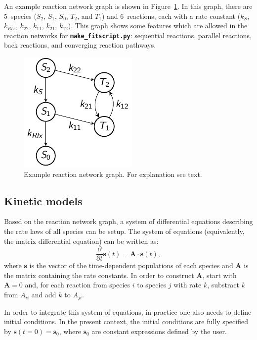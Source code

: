 \documentclass[a4paper,11pt,DIV=15,openany,twoside=false]{scrbook}
\newcommand{\ttt}[1]{\textbf{\texttt{#1}}}
\newcommand{\VEC}[1]{\ensuremath{\mathbf{#1}}}
\begin{document}
An example reaction network graph is shown in Figure~\ref{fig:example_graph}.
In this graph, there are 5~species ($S_2$, $S_1$, $S_0$, $T_2$, and $T_1$) and 6~reactions, each with a rate constant ($k_S$, $k_{Rlx}$, $k_{22}$, $k_{11}$, $k_{21}$, $k_{12}$).
This graph shows some features which are allowed in the reaction networks for \ttt{make\_fitscript.py}: sequential reactions, parallel reactions, back reactions, and converging reaction pathways.

\begin{figure}[h!]
  \centering
  \includegraphics[scale=1]{img/reaction_networks/example_graph.pdf}
  \caption{Example reaction network graph. For explanation see text.}
  \label{fig:example_graph}
\end{figure}

\subsection{Kinetic models}

Based on the reaction network graph, a system of differential equations describing the rate laws of all species can be setup.
The system of equations (equivalently, the matrix differential equation) can be written as:
\begin{equation}
  \frac{\partial}{\partial t} \VEC{s}(t) = \VEC{A} \cdot \VEC{s}(t),
  \label{eq:rate_law}
\end{equation}
where $\VEC{s}$ is the vector of the time-dependent populations of each species and $\VEC{A}$ is the matrix containing the rate constants.
In order to construct $\VEC{A}$, start with $\VEC{A}=0$ and, for each reaction from species $i$ to species $j$ with rate $k$, substract $k$ from $A_{ii}$ and add $k$ to $A_{ji}$.

In order to integrate this system of equations, in practice one also needs to define initial conditions. 
In the present context, the initial conditions are fully specified by $\VEC{s}(t=0)=\VEC{s}_0$, where $\VEC{s}_0$ are constant expressions defined by the user.
\end{document}
